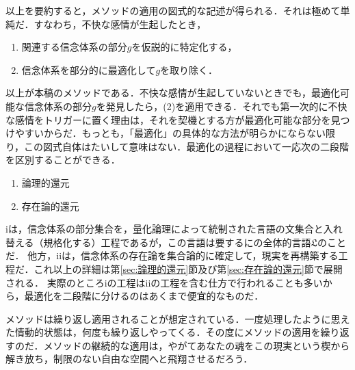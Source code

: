 以上を要約すると，メソッドの適用の図式的な記述が得られる．それは極めて単純だ．すなわち，不快な感情が生起したとき，
\begin{enumerate}[label=(\arabic*)]
    \item 関連する信念体系の部分$g$を仮説的に特定化する，
    \item 信念体系を部分的に最適化して$g$を取り除く．
\end{enumerate}
以上が本稿のメソッドである．不快な感情が生起していないときでも，最適化可能な信念体系の部分$g$を発見したら，(2)を適用できる．それでも第一次的に不快な感情をトリガーに置く理由は，それを契機とする方が最適化可能な部分を見つけやすいからだ．もっとも，「最適化」の具体的な方法が明らかにならない限り，この図式自体はたいして意味はない．最適化の過程において一応次の二段階を区別することができる．
\begin{enumerate}[label=\roman*.]
    \item 論理的還元
    \item 存在論的還元
\end{enumerate}
iは，信念体系の部分集合を，量化論理によって統制された言語の文集合と入れ替える（規格化する）工程であるが，この言語は要するにの全体的言語$\mathfrak{L}$のことだ．
他方，iiは，信念体系の存在論を集合論的に確定して，現実を再構築する工程だ．これ以上の詳細は第\ref{sec:論理的還元}節及び第\ref{sec:存在論的還元}節で展開される．
実際のところiの工程はiiの工程を含む仕方で行われることも多いから，最適化を二段階に分けるのはあくまで便宜的なものだ．

メソッドは繰り返し適用されることが想定されている．一度処理したように思えた情動的状態は，何度も繰り返しやってくる．その度にメソッドの適用を繰り返すのだ．メソッドの継続的な適用は，やがてあなたの魂をこの現実という楔から解き放ち，制限のない自由な空間へと飛翔させるだろう．

